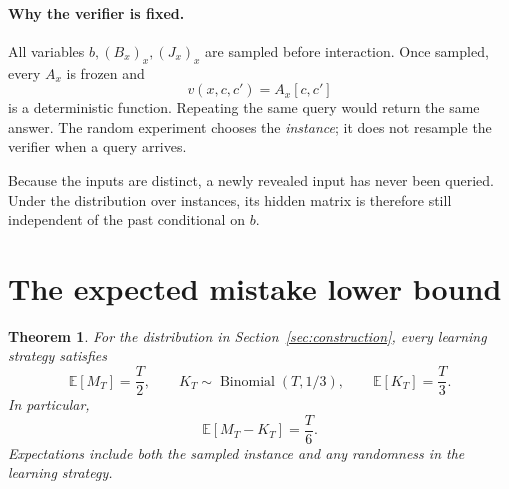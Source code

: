 \documentclass[11pt]{article}
\newcommand{\E}{\mathbb{E}}
\DeclareMathOperator{\Bin}{Binomial}
\newtheorem{theorem}{Theorem}
\theoremstyle{remark}
\begin{document}
\paragraph{Why the verifier is fixed.}
All variables $b,(B_x)_x,(J_x)_x$ are sampled before interaction. Once sampled,
every $A_x$ is frozen and
\[
                    v(x,c,c')=A_x[c,c']
\]
is a deterministic function. Repeating the same query would return the same
answer. The random experiment chooses the \emph{instance}; it does not
resample the verifier when a query arrives.

Because the inputs are distinct, a newly revealed input has never been queried.
Under the distribution over instances, its hidden matrix is therefore still
independent of the past conditional on $b$.

\clearpage
\section{The expected mistake lower bound}

\begin{theorem}\label{thm:random-budget}
For the distribution in Section~\ref{sec:construction}, every learning strategy
satisfies
\begin{equation}\label{eq:main}
 \E[M_T]=\frac{T}{2},\qquad
 K_T\sim\Bin(T,1/3),\qquad
 \E[K_T]=\frac{T}{3}.
\end{equation}
In particular,
\[
                  \boxed{\E[M_T-K_T]=\frac{T}{6}.}
\]
Expectations include both the sampled instance and any randomness in the
learning strategy.
\end{theorem}
\end{document}
